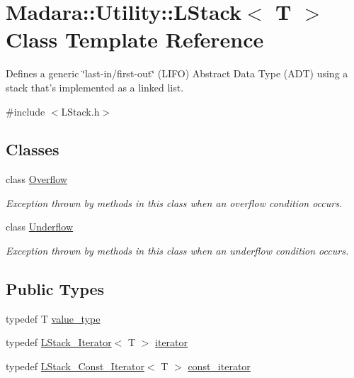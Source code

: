 \hypertarget{classMadara_1_1Utility_1_1LStack}{
\section{Madara::Utility::LStack$<$ T $>$ Class Template Reference}
\label{d1/d68/classMadara_1_1Utility_1_1LStack}
}


Defines a generic \char`\"{}last-\/in/first-\/out\char`\"{} (LIFO) Abstract Data Type (ADT) using a stack that's implemented as a linked list.  




{\ttfamily \#include $<$LStack.h$>$}

\subsection*{Classes}
\begin{DoxyCompactItemize}
\item 
class \hyperlink{classMadara_1_1Utility_1_1LStack_1_1Overflow}{Overflow}
\begin{DoxyCompactList}\small\item\em Exception thrown by methods in this class when an overflow condition occurs. \item\end{DoxyCompactList}\item 
class \hyperlink{classMadara_1_1Utility_1_1LStack_1_1Underflow}{Underflow}
\begin{DoxyCompactList}\small\item\em Exception thrown by methods in this class when an underflow condition occurs. \item\end{DoxyCompactList}\end{DoxyCompactItemize}
\subsection*{Public Types}
\begin{DoxyCompactItemize}
\item 
typedef T \hyperlink{classMadara_1_1Utility_1_1LStack_ab7a73fdf10ed9f004604816d8830c400}{value\_\-type}
\item 
typedef \hyperlink{classMadara_1_1Utility_1_1LStack__Iterator}{LStack\_\-Iterator}$<$ T $>$ \hyperlink{classMadara_1_1Utility_1_1LStack_a655fbffe5cfea6579d334bb4ccfc484a}{iterator}
\item 
typedef \hyperlink{classMadara_1_1Utility_1_1LStack__Const__Iterator}{LStack\_\-Const\_\-Iterator}$<$ T $>$ \hyperlink{classMadara_1_1Utility_1_1LStack_a3e179be3d0b6267aa5fb836cbbb6ca8a}{const\_\-iterator}
\end{DoxyCompactItemize}
